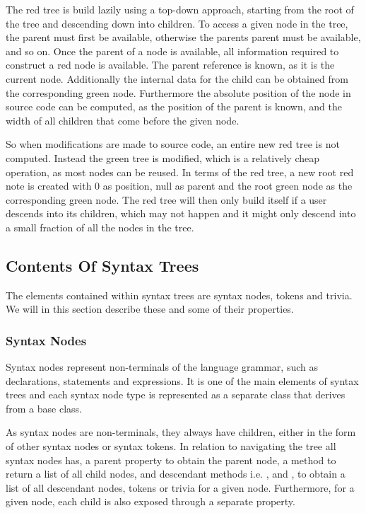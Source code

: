 The red tree is build lazily using a top-down approach, starting from the root of the tree and descending down into children. To access a given node in the tree, the parent must first be available, otherwise the parents parent must be available, and so on. Once the parent of a node is available, all information required to construct a red node is available. The parent reference is known, as it is the current node. Additionally the internal data for the child can be obtained from the corresponding green node. Furthermore the absolute position of the node in source code can be computed, as the position of the parent is known, and the width of all children that come before the given node\cite{sadovRoslynPerf}.

So when modifications are made to source code, an entire new red tree is not computed. Instead the green tree is modified, which is a relatively cheap operation, as most nodes can be reused. In terms of the red tree, a new root red note is created with 0 as position, null as parent and the root green node as the corresponding green node. The red tree will then only build itself if a user descends into its children, which may not happen and it might only descend into a small fraction of all the nodes in the tree\cite{sadovRoslynPerf}. %

\subsection{Contents Of Syntax Trees}
The elements contained within syntax trees are syntax nodes, tokens and trivia. We will in this section describe these and some of their properties.

\subsubsection{Syntax Nodes}
Syntax nodes represent non-terminals of the language grammar, such as declarations, statements and expressions. It is one of the main elements of syntax trees and each syntax node type is represented as a separate class that derives from a base  class.

As syntax nodes are non-terminals, they always have children, either in the form of other syntax nodes or syntax tokens. In relation to navigating the tree all syntax nodes has, a parent property to obtain the parent node, a  method to return a list of all child nodes, and descendant methods i.e. ,  and , to obtain a list of all descendant nodes, tokens or trivia for a given node. Furthermore, for a given node, each child is also exposed through a separate property\cite[p. 7]{ng2012roslyn}.

